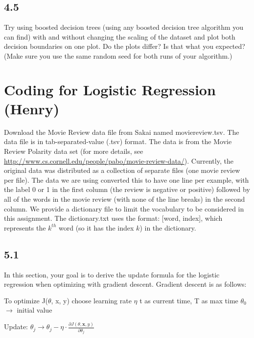 \documentclass{exam}
\begin{document}
\subsection*{4.5}
Try using boosted decision trees (using any boosted decision tree algorithm you can find) with and without changing the scaling of the dataset and plot both decision boundaries on one plot. Do the plots differ? Is that what you expected? (Make sure you use the same random seed for both runs of your algorithm.)

\section{Coding for Logistic Regression (Henry)}

Download the Movie Review data file from Sakai named moviereview.tsv. The data file is in tab-separated-value (.tsv) format. The data is from the Movie Review Polarity data set (for more details, see \url{http://www.cs.cornell.edu/people/pabo/movie-review-data/}). Currently, the original data was distributed as a collection of separate files (one movie review per file). The data we are using converted this to have one line per example, with the label 0 or 1 in the first column (the review is negative or positive) followed by all of the words in the movie review (with none of the line breaks) in the second column. We provide a dictionary file to limit the vocabulary to be considered in this assignment. The dictionary.txt uses the format: [word, index], which represents the $k^{th}$ word (so it has the index $k$) in the dictionary. 

\subsection*{5.1}

In this section, your goal is to derive the update formula for the logistic regression when optimizing with gradient descent. Gradient descent is as follows:
\begin{algorithm}
\begin{algorithmic}
    \STATE To optimize J($\theta$, x, y)
    \STATE choose learning rate $\eta$
    \STATE t as current time, T as max time
    \STATE $\theta_0$ $\to$ initial value

    \STATE Update: $\theta_{j} \to\theta_{j} - \eta\cdot\frac{\partial J(\theta, \mathbf{x}, y) }{\partial \theta_{j}}$
    \ENDWHILE
\end{algorithmic}
\end{algorithm}
\end{document}
